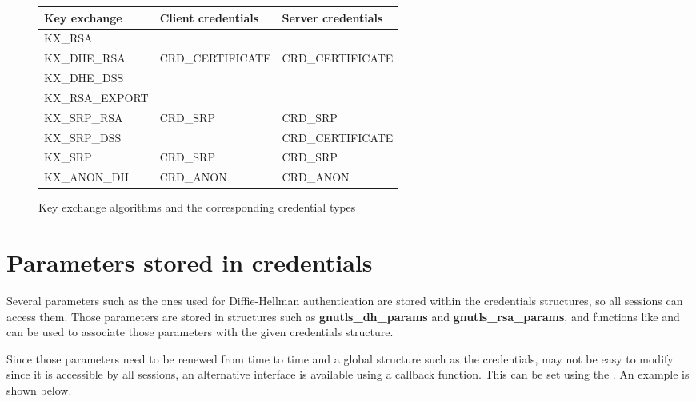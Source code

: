 \begin{figure}[hbtp]
\begin{tabular}{|l|l|p{4.5cm}|}

\hline
\bf{Key exchange} & \bf{Client credentials} & \bf{Server credentials}
\\
\hline
\hline
KX\_RSA &&
\\
\cline{1-1}
KX\_DHE\_RSA & CRD\_CERTIFICATE & CRD\_CERTIFICATE
\\
\cline{1-1}
KX\_DHE\_DSS &&
\\
\cline{1-1}
KX\_RSA\_EXPORT &&
\\
\hline
KX\_SRP\_RSA & CRD\_SRP & CRD\_SRP
\\
\cline{1-1}
KX\_SRP\_DSS && CRD\_CERTIFICATE
\\
\hline
KX\_SRP & CRD\_SRP & CRD\_SRP
\\
\hline
KX\_ANON\_DH & CRD\_ANON & CRD\_ANON
\\
\hline
\end{tabular}

\caption{Key exchange algorithms and the corresponding credential types}
\label{fig:kxcred}

\end{figure}



\section{Parameters stored in credentials}

Several parameters such as the ones used for Diffie-Hellman authentication
are stored within the credentials structures, so all sessions can access
them. Those parameters are stored in structures such as {\bf gnutls_dh_params}
and {\bf gnutls_rsa_params}, and functions like 
and
can be used to associate those parameters with the given credentials structure.
\par
Since those parameters need to be renewed from time to time and a 
global structure such as the credentials, may not be easy to modify
since it is accessible by all sessions, an alternative interface is
available using a callback function.
This can be set using the
.
An example is shown below.

